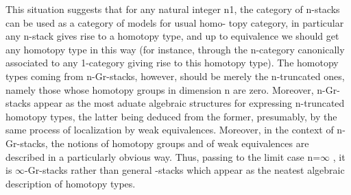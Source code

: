 This situation suggests that for any natural integer n\hand{$\geq$}1, the
category of n-stacks can be used as a category of models for  usual homo-%
topy category, in particular any n-stack gives rise to a homotopy type,
 and up to equivalence we should get any homotopy type in this
way (for instance, through the n-category canonically associated to
any 1-category giving rise to this homotopy type). The homotopy types
coming from n-Gr-stacks, however, should be merely the n-truncated
ones, namely those whose homotopy groups in dimension \hand{$>$} n are zero.
 Moreover,  n-Gr-stacks appear as  the most aduate 
algebraic structures for expressing n-truncated homotopy types, the
latter being deduced from the former, presumably, by the same process
of localization by weak equivalences. Moreover, in the context of
n-Gr-stacks, the notions of homotopy groups and of weak equivalences
are described in a particularly obvious way. Thus, passing to the
limit case n=$\infty$ , it is $\infty$-Gr-stacks rather than general \hand{$\infty$}-stacks
which appear as the neatest algebraic description of homotopy types.

